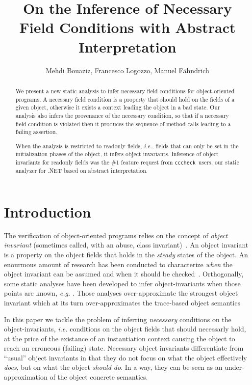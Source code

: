 \documentclass{llncs}
\title{On the Inference of Necessary Field Conditions with Abstract Interpretation}
\author{Mehdi Bouaziz, Francesco Logozzo, Manuel F{\"a}hndrich}
\institute{Microsoft Research, Redmond, WA (USA)}
\newcommand{\cccheck}{\texttt{cccheck}}
\begin{document}
\maketitle

\begin{abstract}
We present a new static analysis to infer necessary field conditions for object-oriented programs.
A necessary field condition is a property that should hold on the fields of a given object, otherwise it exists a context leading the object in a bad state.
Our analysis also infers the provenance of the necessary condition, so that if a necessary field condition is violated then it produces the sequence of method calls leading to a failing assertion. 

When the analysis is restricted to readonly fields, \emph{i.e.}, fields that can only be set in the initialization phases of the object,  it infers object invariants.
Inference of object invariants for readonly fields was the \#1 feature request from \cccheck\ users, our static analyzer for .NET based on abstract interpretation.
\end{abstract}

\section{Introduction}
The verification of object-oriented programs relies on the concept of \emph{object invariant} (sometimes called, with an abuse, class invariant)~\cite{eiffel}.
An object invariant is a property on the object fields that holds in the \emph{steady} states of the object.
An enourmous amount of research has been conducted to characterize \emph{when} the object invariant can be assumed and when it should be checked~\cite{DrossopoulouEtAl08}.
Orthogonally, some static analyses have been developed to infer object-invariants when those points are known, \emph{e.g.} \cite{LogozzoPhD04}.
Those analyses over-approximate the strongest object invariant which at its turn over-approximates the trace-based object  semantics~\cite{LogozzoPhD04}

In this paper we tackle the problem of inferring \emph{necessary} conditions on the object-invariants, \emph{i.e.} conditions on the object fields that should necessarly hold, at the price of the existance of an instantiation context causing the object to reach an erroneous (failing) state.
Necessary object invariants differentiate from ``usual'' object invariants in that they do not focus on what the object effectively \emph{does}, but on what the object \emph{should do}.
In a way, they can be seen as an under-approximation of the object concrete semantics.
\end{document}
